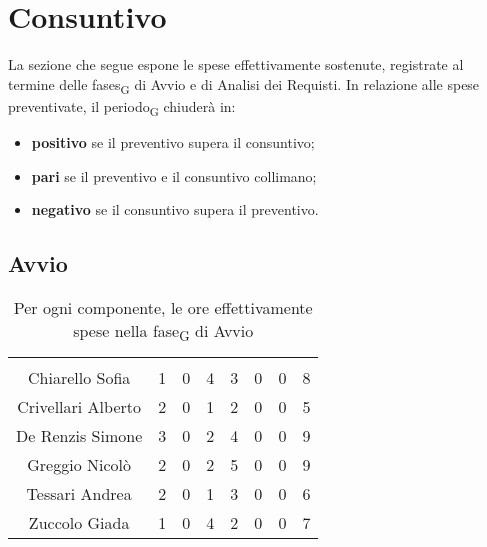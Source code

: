 \section{Consuntivo}

La sezione che segue espone le spese effettivamente sostenute, registrate al termine delle \glspl{fase}\textsubscript{G} di Avvio e di Analisi dei Requisti. In relazione alle spese preventivate, il \gls{periodo}\textsubscript{G} chiuderà in:
\begin{itemize}
	\item \textbf{positivo} se il preventivo supera il consuntivo;
	\item \textbf{pari} se il preventivo e il consuntivo collimano;
	\item \textbf{negativo} se il consuntivo supera il preventivo.
\end{itemize}


\subsection{Avvio}

\begin{table}[H]
	\begin{center}
		\begin{tabular}{c
				!{\color[HTML]{9b240a}\vrule width 1pt}
				cccccc
				!{\color[HTML]{9b240a}\vrule width 1pt}	
				c}
			\rowcolorhead
			 &  &  &  &  &  &  &  \\
			
			Chiarello Sofia & 1 & 0 & 4 & 3 & 0 & 0 & 8\\
			Crivellari Alberto & 2 & 0 & 1 & 2 & 0 & 0 & 5\\
			De Renzis Simone & 3 & 0 & 2 & 4 & 0 & 0 & 9\\
			Greggio Nicolò & 2 & 0 & 2 & 5 & 0 & 0 & 9\\
			Tessari Andrea & 2 & 0 & 1 & 3 & 0 & 0 & 6\\
			Zuccolo Giada & 1 & 0 & 4 & 2 & 0 & 0 & 7\\
		\end{tabular}
		\caption[Consuntivo \gls{fase}\textsubscript{G} di Avvio]{Per ogni componente, le ore effettivamente spese nella \gls{fase}\textsubscript{G} di Avvio}
	\end{center}
\end{table}





